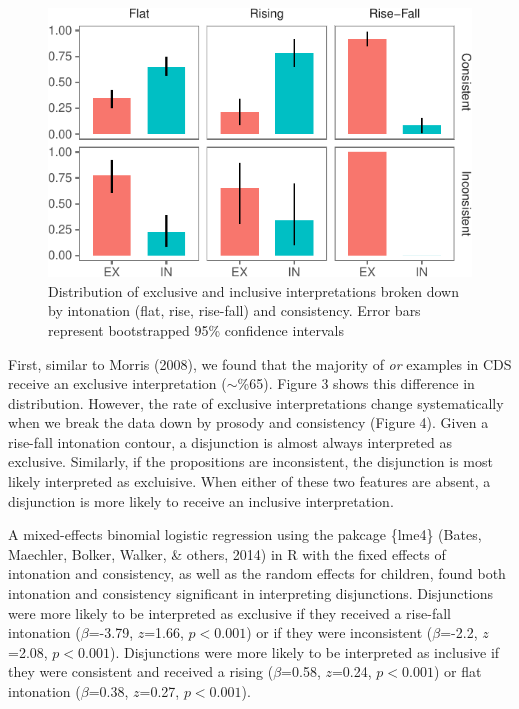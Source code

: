 \documentclass[10pt, letterpaper]{article}
\newenvironment{CodeChunk}{}{}
\begin{document}
\begin{CodeChunk}
\begin{figure}[t]

{\centering \includegraphics{figs/interpretationByIntonationAndConsistency-1} 

}

\caption[Distribution of exclusive and inclusive interpretations broken down by intonation (flat, rise, rise-fall) and consistency]{Distribution of exclusive and inclusive interpretations broken down by intonation (flat, rise, rise-fall) and consistency. Error bars represent bootstrapped 95\% confidence intervals}\label{fig:interpretationByIntonationAndConsistency}
\end{figure}
\end{CodeChunk}

First, similar to Morris (2008), we found that the majority of \emph{or}
examples in CDS receive an exclusive interpretation (\(\sim\)\%65).
Figure 3 shows this difference in distribution. However, the rate of
exclusive interpretations change systematically when we break the data
down by prosody and consistency (Figure 4). Given a rise-fall intonation
contour, a disjunction is almost always interpreted as exclusive.
Similarly, if the propositions are inconsistent, the disjunction is most
likely interpreted as excluisive. When either of these two features are
absent, a disjunction is more likely to receive an inclusive
interpretation.

A mixed-effects binomial logistic regression using the pakcage \{lme4\}
(Bates, Maechler, Bolker, Walker, \& others, 2014) in R with the fixed
effects of intonation and consistency, as well as the random effects for
children, found both intonation and consistency significant in
interpreting disjunctions. Disjunctions were more likely to be
interpreted as exclusive if they received a rise-fall intonation
(\(\beta\)=-3.79, \(z\)=1.66, \(p < 0.001\)) or if they were
inconsistent (\(\beta\)=-2.2, \(z\)=2.08, \(p < 0.001\)). Disjunctions
were more likely to be interpreted as inclusive if they were consistent
and received a rising (\(\beta\)=0.58, \(z\)=0.24, \(p < 0.001\)) or
flat intonation (\(\beta\)=0.38, \(z\)=0.27, \(p < 0.001\)).
\end{document}
